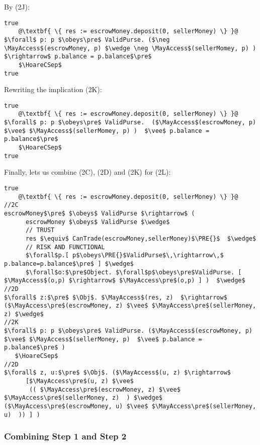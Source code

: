 By  (2J):

\begin{lstlisting}[escapechar=@]
true
    @\textbf{ \{ res := escrowMoney.deposit(0, sellerMoney) \} }@
$\forall$ p: p $\obeys\pre$ ValidPurse. ($\neg \MayAccess$(escrowMoney, p) $\wedge \neg \MayAccess$(sellerMomey, p) ) $\rightarrow$ p.balance = p.balance$\pre$
    $\HoareCSep$
true
\end{lstlisting}

Rewriting the implication (2K):

\begin{lstlisting}[escapechar=@]
true
    @\textbf{ \{ res := escrowMoney.deposit(0, sellerMoney) \} }@
$\forall$ p: p $\obeys\pre$ ValidPurse.  ($\MayAccess$(escrowMoney, p) $\vee$ $\MayAccess$(sellerMomey, p) )  $\vee$ p.balance = p.balance$\pre$
    $\HoareCSep$
true
\end{lstlisting}

Finally,  lets us combine (2C), (2D) and (2K) for (2L):

\begin{lstlisting}[escapechar=@]
true
    @\textbf{ \{ res := escrowMoney.deposit(0, sellerMoney) \} }@
//2C
escrowMoney$\pre$ $\obeys$ ValidPurse $\rightarrow$ (
      escrowMoney $\obeys$ ValidPurse $\wedge$
      // TRUST
      res $\equiv$ CanTrade(escrowMoney,sellerMoney)$\PRE{}$  $\wedge$
      // RISK AND FUNCTIONAL
      $\forall$p.[ p$\obeys\PRE{}$ValidPurse$\,\rightarrow\,$ p.balance=p.balance$\pre$ ] $\wedge$
      $\forall$o:$\pre$Object. $\forall$p$\obeys\pre$ValidPurse. [ $\MayAccess$(o,p) $\rightarrow$ $\MayAccess\pre$(o,p) ] )  $\wedge$
//2D
$\forall$ z:$\pre$ $\Obj$. $\MayAccess$(res, z)  $\rightarrow$ ($\MayAccess\pre$(escrowMoney, z) $\vee$ $\MayAccess\pre$(sellerMoney, z) $\wedge$
//2K
$\forall$ p: p $\obeys\pre$ ValidPurse. ($\MayAccess$(escrowMoney, p) $\vee$ $\MayAccess$(sellerMoney, p)  $\vee$ p.balance = p.balance$\pre$ )
   $\HoareCSep$
//2D
$\forall$ z, u:$\pre$ $\Obj$. ($\MayAccess$(u, z) $\rightarrow$
      [$\MayAccess\pre$(u, z) $\vee$
       (( $\MayAccess\pre$(escrowMoney, z) $\vee$ $\MayAccess\pre$(sellerMoney, z)  ) $\wedge$ ($\MayAccess\pre$(escrowMoney, u) $\vee$ $\MayAccess\pre$(sellerMoney, u)  )) ] )
\end{lstlisting}

\subsubsection{Combining Step 1 and Step 2}

